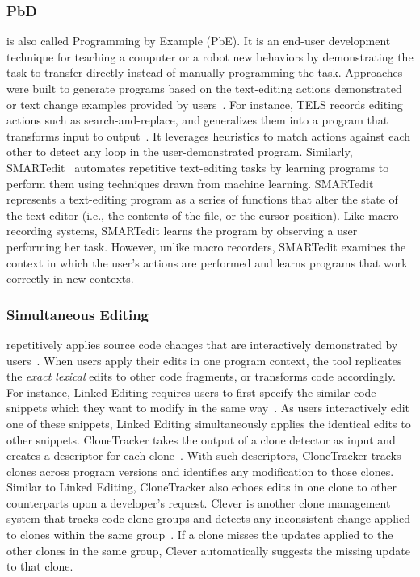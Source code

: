 \documentclass[runningheads,a4paper]{llncs}
\begin{document}
\subsubsection{PbD} is also called Programming by Example (PbE). It is an end-user development technique for teaching a computer or a robot new behaviors by demonstrating the task to transfer directly instead of manually programming the task.
Approaches were built to generate programs based on the text-editing actions demonstrated or text change examples provided by users~\cite{Nix1984,WiM1993,LaH1995,LWD2001}. For instance, 
TELS records editing actions such as search-and-replace, and generalizes them into a program that transforms input to output~\cite{WiM1993}. It leverages heuristics to match actions against each other to detect any loop in the user-demonstrated program. 
Similarly, SMARTedit~\cite{LWD2001} automates repetitive text-editing tasks by learning programs to perform them using techniques drawn from machine learning. SMARTedit represents a text-editing program as a series of functions that alter the state of the text editor (i.e., the contents of the file, or the cursor position). Like macro recording systems, SMARTedit learns the program by observing a user performing her task. However, unlike macro recorders, SMARTedit examines the context in which the user's actions are performed and learns programs that work correctly in new contexts. 

\subsubsection{Simultaneous Editing} repetitively applies source code changes that are interactively demonstrated by users~\cite{MiM2001}. When users apply their edits in one program context, the tool replicates the \emph{exact lexical} edits to other code fragments, or transforms code accordingly. For instance, Linked Editing requires users to first specify the similar code snippets which they want to modify in the same way~\cite{TBG2004}. As users interactively edit one of these snippets, Linked Editing simultaneously applies the identical edits to other snippets. 
CloneTracker takes the output of a clone detector as input and creates a descriptor for each clone~\cite{DuR2007}. With such descriptors, CloneTracker tracks clones across program versions and identifies any modification to those clones. 
Similar to Linked Editing, CloneTracker also echoes edits in one clone to other counterparts upon a developer's request. 
Clever is another clone management system that tracks code clone groups and detects any inconsistent change applied to clones within the same group~\cite{NNP2009}. If a clone misses the updates applied to the other clones in the same group, Clever automatically suggests the missing update to that clone.
\end{document}
